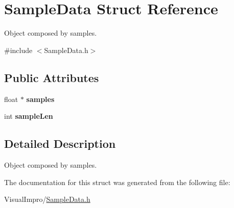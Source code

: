 \hypertarget{struct_sample_data}{}\section{Sample\+Data Struct Reference}
\label{struct_sample_data}


Object composed by samples.  




{\ttfamily \#include $<$Sample\+Data.\+h$>$}

\subsection*{Public Attributes}
\begin{DoxyCompactItemize}
\item 
\mbox{\label{struct_sample_data_abab0a93a09ecbf48e334f1ffdbf5ab6d}} 
float $\ast$ {\bfseries samples}
\item 
\mbox{\label{struct_sample_data_a03601c4dc331bac2ef7e865a63c336c5}} 
int {\bfseries sample\+Len}
\end{DoxyCompactItemize}


\subsection{Detailed Description}
Object composed by samples. 

The documentation for this struct was generated from the following file\+:\begin{DoxyCompactItemize}
\item 
Visual\+Impro/\mbox{\hyperlink{_sample_data_8h}{Sample\+Data.\+h}}\end{DoxyCompactItemize}
